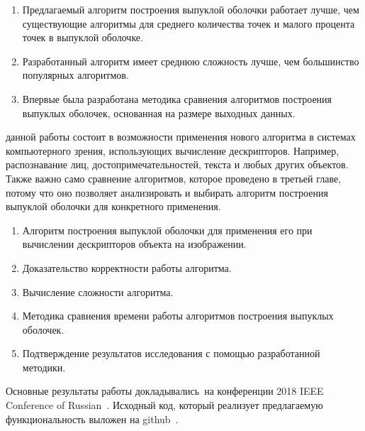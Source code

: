 {\novelty}
\begin{enumerate}
	\item Предлагаемый алгоритм построения выпуклой оболочки работает лучше, чем существующие алгоритмы для среднего количества точек и малого процента точек в выпуклой оболочке.
	\item Разработанный алгоритм имеет среднюю сложность лучше, чем большинство популярных алгоритмов.
	\item Впервые была разработана методика сравнения алгоритмов построения выпуклых оболочек, основанная на размере выходных данных.
\end{enumerate}

{\influence} данной работы состоит в возможности применения нового алгоритма в системах компьютерного зрения, использующих вычисление дескрипторов. Например, распознавание лиц, достопримечательностей, текста и любых других объектов. Также важно само сравнение алгоритмов, которое проведено в третьей главе, потому что оно позволяет анализировать и выбирать алгоритм построения выпуклой оболочки для конкретного применения.

{}
\begin{enumerate}
 	\item Алгоритм построения выпуклой оболочки для применения его при вычислении дескрипторов объекта на изображении.
	\item Доказательство корректности работы алгоритма.
	\item Вычисление сложности алгоритма.
	\item Методика сравнения времени работы алгоритмов построения выпуклых оболочек.
	\item Подтверждение результатов исследования с помощью разработанной методики.
\end{enumerate}

{\probation}
Основные результаты работы докладывались~на конференции 2018 IEEE Conference of Russian~\cite{matrokhin2018convex}. Исходный код, который реализует предлагаемую функциональность выложен на github~\cite{matrokhin2017github}.
